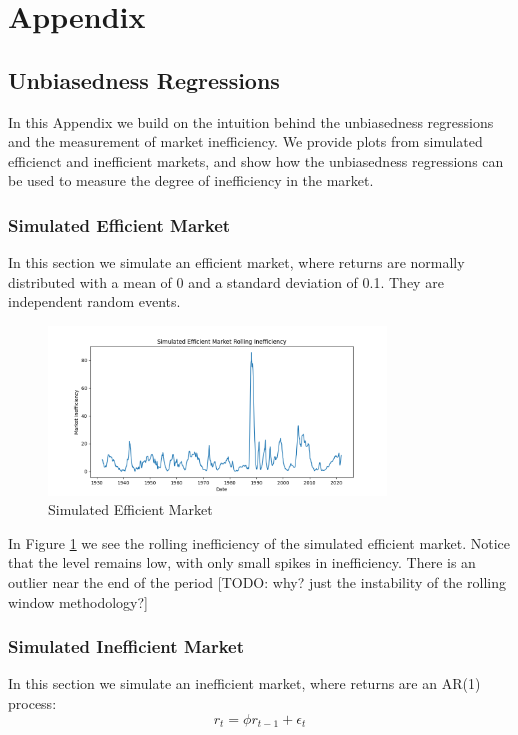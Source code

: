 \section{Appendix}
\label{sec:appendix}

\subsection{Unbiasedness Regressions}
In this Appendix we build on the intuition behind the unbiasedness regressions and the measurement of market inefficiency.
We provide plots from simulated efficienct and inefficient markets, and show how the unbiasedness regressions can be used to measure the degree of inefficiency in the market.

\subsubsection{Simulated Efficient Market}
In this section we simulate an efficient market, where returns are normally distributed with a mean of 0 and a standard deviation of 0.1.
They are independent random events.

\begin{figure}[h]
    \centering
    \includegraphics[width=0.8\textwidth]{../figs/Simulated Efficient Market Rolling Inefficiency.png}
    \caption{Simulated Efficient Market}
    \label{fig:efficient_market}
\end{figure}

In Figure \ref{fig:efficient_market} we see the rolling inefficiency of the simulated efficient market.
Notice that the level remains low, with only small spikes in inefficiency. There is an outlier near the end of the period
[TODO: why? just the instability of the rolling window methodology?]

\subsubsection{Simulated Inefficient Market}
In this section we simulate an inefficient market, where returns are an AR(1) process:
\begin{equation}
    r_t = \phi r_{t-1} + \epsilon_t
\end{equation}

